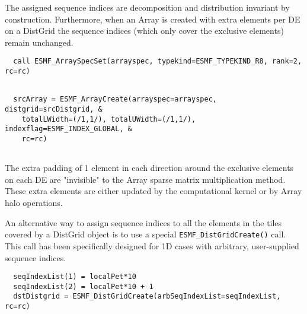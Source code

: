    The assigned sequence indices are decomposition and distribution invariant by
   construction. Furthermore, when an Array is created with extra elements per DE on
   a DistGrid the sequence indices (which only cover the exclusive elements) remain
   unchanged. 

 \begin{verbatim}
  call ESMF_ArraySpecSet(arrayspec, typekind=ESMF_TYPEKIND_R8, rank=2, rc=rc)
 
\end{verbatim}
 
 

 \begin{verbatim}
  srcArray = ESMF_ArrayCreate(arrayspec=arrayspec, distgrid=srcDistgrid, &
    totalLWidth=(/1,1/), totalUWidth=(/1,1/), indexflag=ESMF_INDEX_GLOBAL, &
    rc=rc)
 
\end{verbatim}
 

   The extra padding of 1 element in each direction around the exclusive elements on
   each DE are "invisible" to the Array sparse matrix multiplication method. These
   extra elements are either updated by the computational kernel or by Array halo
   operations.
  
   An alternative way to assign sequence indices to all the elements in the tiles
   covered by a DistGrid object is to use a special {\tt ESMF\_DistGridCreate()}
   call. This call has been specifically designed for 1D cases with arbitrary,
   user-supplied sequence indices. 

 \begin{verbatim}
  seqIndexList(1) = localPet*10
  seqIndexList(2) = localPet*10 + 1
  dstDistgrid = ESMF_DistGridCreate(arbSeqIndexList=seqIndexList, rc=rc)
 
\end{verbatim}
 

